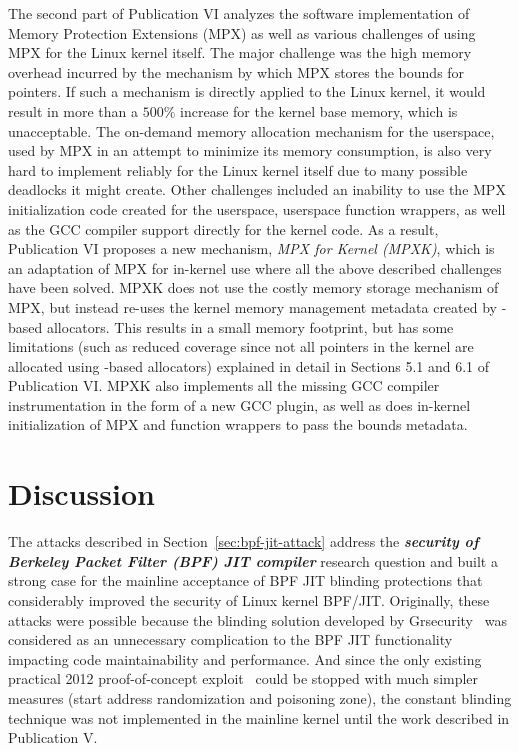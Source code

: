 The second part of Publication VI analyzes the software implementation of \intel Memory Protection Extensions (MPX) as well as various challenges of using MPX for the Linux kernel itself. The major challenge was the high memory overhead incurred by the mechanism by which MPX stores the bounds for pointers. If such a mechanism is directly applied to the Linux kernel, it would result in more than a $500\%$ increase for the kernel base memory, which is unacceptable. The on-demand memory allocation mechanism for the userspace, used by MPX in an attempt to minimize its memory consumption, is also very hard to implement reliably for the Linux kernel itself due to many possible deadlocks it might create. Other challenges included an inability to use the MPX initialization code created for the userspace, userspace function wrappers, as well as the GCC compiler support directly for the kernel code.
As a result, Publication VI proposes a new mechanism, \emph{MPX for Kernel (MPXK)}, which is an adaptation of \intel MPX for in-kernel use where all the above described challenges have been solved. MPXK does not use the costly memory storage mechanism of MPX, but instead re-uses the kernel memory management metadata created by -based allocators. This results in a small memory footprint, but has some limitations (such as reduced coverage since not all pointers in the kernel are allocated using -based allocators) explained in detail in Sections 5.1 and 6.1 of Publication VI. MPXK also implements all the missing GCC compiler instrumentation in the form of a new GCC plugin, as well as does in-kernel initialization of MPX and function wrappers to pass the bounds metadata. 

\section{Discussion}


The attacks described in Section~\ref{sec:bpf-jit-attack} address the \textit{\textbf{security of Berkeley Packet Filter (BPF) JIT compiler}} research question and built a strong case for the mainline acceptance of BPF JIT blinding protections that considerably improved the security of Linux kernel BPF/JIT. Originally, these attacks were possible because the blinding solution developed by Grsecurity~\cite{grsecurity} was considered as an unnecessary complication to the BPF JIT functionality impacting code maintainability and performance. And since the only existing practical 2012 proof-of-concept exploit~\cite{mcallister2012attacking} could be stopped with much simpler measures (start address randomization and poisoning zone), the constant blinding technique was not implemented in the mainline kernel until the work described in Publication V. 

